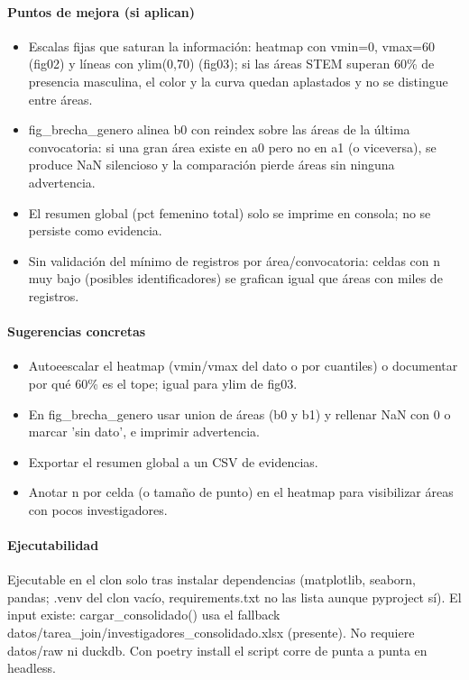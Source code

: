 \paragraph{Puntos de mejora (si aplican)}
\begin{itemize}
  \item Escalas fijas que saturan la información: heatmap con vmin=0, vmax=60 (fig02) y líneas con ylim(0,70) (fig03); si las áreas STEM superan 60\% de presencia masculina, el color y la curva quedan aplastados y no se distingue entre áreas.
  \item fig\_brecha\_genero alinea b0 con reindex sobre las áreas de la última convocatoria: si una gran área existe en a0 pero no en a1 (o viceversa), se produce NaN silencioso y la comparación pierde áreas sin ninguna advertencia.
  \item El resumen global (pct femenino total) solo se imprime en consola; no se persiste como evidencia.
  \item Sin validación del mínimo de registros por área/convocatoria: celdas con n muy bajo (posibles identificadores) se grafican igual que áreas con miles de registros.
\end{itemize}

\paragraph{Sugerencias concretas}
\begin{itemize}
  \item Autoeescalar el heatmap (vmin/vmax del dato o por cuantiles) o documentar por qué 60\% es el tope; igual para ylim de fig03.
  \item En fig\_brecha\_genero usar union de áreas (b0 y b1) y rellenar NaN con 0 o marcar 'sin dato', e imprimir advertencia.
  \item Exportar el resumen global a un CSV de evidencias.
  \item Anotar n por celda (o tamaño de punto) en el heatmap para visibilizar áreas con pocos investigadores.
\end{itemize}

\paragraph{Ejecutabilidad}
Ejecutable en el clon solo tras instalar dependencias (matplotlib, seaborn, pandas; .venv del clon vacío, requirements.txt no las lista aunque pyproject sí). El input existe: cargar\_consolidado() usa el fallback datos/tarea\_join/investigadores\_consolidado.xlsx (presente). No requiere datos/raw ni duckdb. Con poetry install el script corre de punta a punta en headless.

